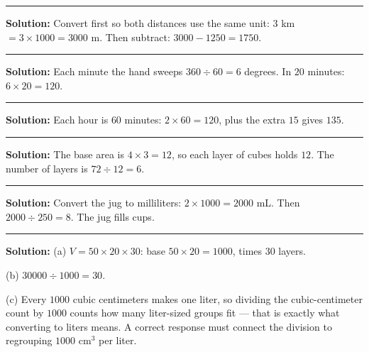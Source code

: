 \documentclass[12pt]{article}
\begin{document}
\vspace{0.2cm}\noindent\rule{\linewidth}{0.2pt}\vspace{0.1cm}


\textbf{Solution:} Convert first so both distances use the same unit:
$3$ km $= 3 \times 1000 = 3000$ m. Then subtract: $3000 - 1250 = 1750$.

\vspace{0.2cm}\noindent\rule{\linewidth}{0.2pt}\vspace{0.1cm}


\textbf{Solution:} Each minute the hand sweeps $360 \div 60 = 6$ degrees.
In $20$ minutes: $6 \times 20 = 120$. 

\vspace{0.2cm}\noindent\rule{\linewidth}{0.2pt}\vspace{0.1cm}


\textbf{Solution:} Each hour is $60$ minutes: $2 \times 60 = 120$, plus the
extra $15$ gives $135$. 

\vspace{0.2cm}\noindent\rule{\linewidth}{0.2pt}\vspace{0.1cm}


\textbf{Solution:} The base area is $4 \times 3 = 12$, so each layer of
cubes holds $12$. The number of layers is $72 \div 12 = 6$.

\vspace{0.2cm}\noindent\rule{\linewidth}{0.2pt}\vspace{0.1cm}


\textbf{Solution:} Convert the jug to milliliters: $2 \times 1000 = 2000$
mL. Then $2000 \div 250 = 8$. The jug fills  cups.

\vspace{0.2cm}\noindent\rule{\linewidth}{0.2pt}\vspace{0.1cm}


\textbf{Solution:}
(a) $V = 50 \times 20 \times 30$: base $50 \times 20 = 1000$, times $30$
layers. 

(b) $30000 \div 1000 = 30$. 

(c) Every $1000$ cubic centimeters makes one liter, so dividing the
cubic-centimeter count by $1000$ counts how many liter-sized groups fit ---
that is exactly what converting to liters means. A correct response must
connect the division to regrouping $1000$ cm$^3$ per liter.
\end{document}
